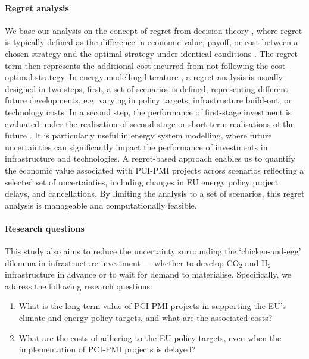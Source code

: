\documentclass[pdflatex,sn-nature]{sn-jnl}%
\theoremstyle{thmstyleone}%
\theoremstyle{thmstyletwo}%
\theoremstyle{thmstylethree}%
\begin{document}
\paragraph{Regret analysis}
We base our analysis on the concept of regret from decision theory \cite{loomesRegretTheoryAlternative1982}, where regret is typically defined as the difference in economic value, payoff, or cost between a chosen strategy and the optimal strategy under identical conditions \cite{mobiusRegretAnalysisInvestment2020}. The regret term then represents the additional cost incurred from not following the cost-optimal strategy. In energy modelling literature \cite{vanderweijdeEconomicsPlanningElectricity2012,mobiusRegretAnalysisInvestment2020}, a regret analysis is usually designed in two steps, first, a set of scenarios is defined, representing different future developments, e.g. varying in policy targets, infrastructure build-out, or technology costs. In a second step, the performance of first-stage investment is evaluated under the realisation of second-stage or short-term realisations of the future \cite{salvatoreManagerialEconomicPrinciples2008}. It is particularly useful in energy system modelling, where future uncertainties can significantly impact the performance of investments in infrastructure and technologies.
A regret-based approach enables us to quantify the economic value associated with PCI-PMI projects across scenarios reflecting a selected set of uncertainties, including changes in EU energy policy project delays, and cancellations. By limiting the analysis to a set of scenarios, this regret analysis is manageable and computationally feasible.

\paragraph{Research questions}
This study also aims to reduce the uncertainty surrounding the `chicken-and-egg' dilemma in infrastructure investment --- whether to develop CO$_2$ and H$_2$ infrastructure in advance or to wait for demand to materialise. Specifically, we address the following research questions: 
\begin{enumerate} 
  \item What is the long-term value of PCI-PMI projects in supporting the EU’s climate and energy policy targets, and what are the associated costs?
  \item What are the costs of adhering to the EU policy targets, even when the implementation of PCI-PMI projects is delayed?
\end{enumerate}
\end{document}
